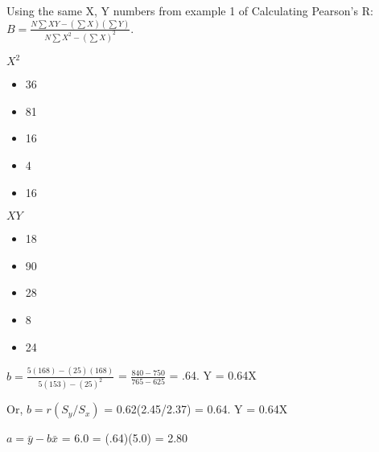 \documentclass[11pt]{report}
\begin{document}
\newpage
{}
{
    Using the same X, Y numbers from example 1 of Calculating Pearson's R: \newline\newline
    $B = \frac{N\sum XY-(\sum X)(\sum Y)}{N\sum X^2 - (\sum X)^2}$. \newline

    \begin{multicols}{2}
        $X^2$
        \begin{itemize}
            \item 36
            \item 81
            \item 16
            \item 4
            \item 16
        \end{itemize}   
        \columnbreak
        $XY$
        \begin{itemize}
            \item 18
            \item 90
            \item 28
            \item 8
            \item 24
        \end{itemize}
    \end{multicols}

    $b = \frac{5(168) - (25)(168)}{5(153) - (25)^2}$ = $\frac{840 - 750}{765 - 625}$ = .64. \newline\newline
    Y = 0.64X \newline
    
    Or, $b = r(S_y/S_x)$ = 0.62(2.45/2.37) = 0.64. \newline\newline
    Y = 0.64X \newline

    $a = \bar{y} - b\bar{x}$ = 6.0 = (.64)(5.0) = 2.80 \newline

}
\end{document}
